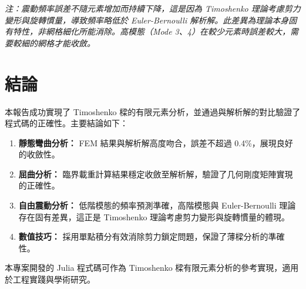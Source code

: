 \documentclass[UTF8, a4paper, 12pt]{ctexart}
\begin{document}
\textit{注：震動頻率誤差不隨元素增加而持續下降，這是因為 Timoshenko 理論考慮剪力變形與旋轉慣量，導致頻率略低於 Euler-Bernoulli 解析解。此差異為理論本身固有特性，非網格細化所能消除。高模態（Mode 3、4）在較少元素時誤差較大，需要較細的網格才能收斂。}

\section{結論}

本報告成功實現了 Timoshenko 樑的有限元素分析，並通過與解析解的對比驗證了程式碼的正確性。主要結論如下：

\begin{enumerate}
  \item \textbf{靜態彎曲分析：} FEM 結果與解析解高度吻合，誤差不超過 0.4\%，展現良好的收斂性。
  
  \item \textbf{屈曲分析：} 臨界載重計算結果穩定收斂至解析解，驗證了几何剛度矩陣實現的正確性。
  
  \item \textbf{自由震動分析：} 低階模態的頻率預測準確，高階模態與 Euler-Bernoulli 理論存在固有差異，這正是 Timoshenko 理論考慮剪力變形與旋轉慣量的體現。
  
  \item \textbf{數值技巧：} 採用單點積分有效消除剪力鎖定問題，保證了薄樑分析的準確性。
\end{enumerate}

本專案開發的 Julia 程式碼可作為 Timoshenko 樑有限元素分析的參考實現，適用於工程實踐與學術研究。
\end{document}
